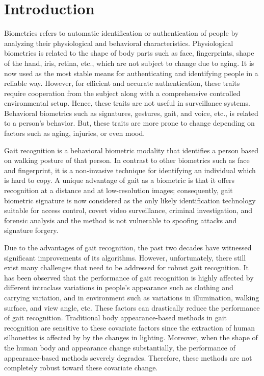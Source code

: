\chapter{Introduction}\label{intro}
Biometrics refers to automatic identification or authentication of people by analyzing their physiological and behavioral characteristics. Physiological biometrics is related to the shape of body parts such as face, fingerprints, shape of the hand, iris, retina, etc., which are not subject to change due to aging. It is now used as the most stable means for authenticating and identifying people in a reliable way. However, for efficient and accurate authentication, these traits require cooperation from the subject along with a comprehensive controlled environmental setup. Hence, these traits are not useful in surveillance systems. Behavioral biometrics such as signatures, gestures, gait, and voice, etc., is related to a person’s behavior. But, these traits are more prone to change depending on factors such as aging, injuries, or even mood. 

Gait recognition is a behavioral biometric modality that identifies a person based on walking posture of that person. In contrast to other biometrics such as face and fingerprint, it is a non-invasive technique for identifying an individual which is hard to copy. A unique advantage of gait as a biometric is that it offers recognition at a distance and at low-resolution images; consequently, gait biometric signature is now considered as the only likely identification technology suitable for access control, covert video surveillance, criminal investigation, and forensic analysis and the method is not vulnerable to spoofing attacks and signature forgery.

Due to the advantages of gait recognition, the past two decades have witnessed significant improvements of its algorithms. However, unfortunately, there still exist many challenges that need to be addressed for robust gait recognition. It has been observed that the performance of gait recognition is highly affected by different intraclass variations in people's appearance such as clothing and carrying variation, and in environment such as variations in illumination, walking surface, and view angle, etc. These factors can drastically reduce the performance of gait recognition. Traditional body appearance-based methods in gait recognition are sensitive to these covariate factors since the extraction of human silhouettes is affected by by the changes in lighting. Moreover, when the shape of the human body and appearance change substantially, the performance of appearance-based methods severely degrades. Therefore, these methods are not completely robust toward these covariate change.

